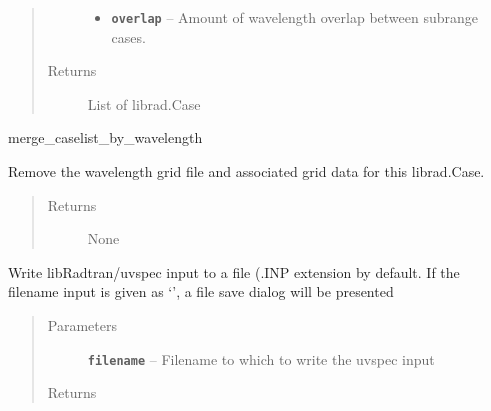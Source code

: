 \documentclass[a4paper,10pt,english]{sphinxmanual}
\begin{document}
\begin{fulllineitems}
\begin{fulllineitems}
\begin{quote}
\begin{description}
\begin{itemize}
\item {} 
\textbf{\texttt{overlap}} -- Amount of wavelength overlap between subrange cases.

\end{itemize}

\item[{Returns}] \leavevmode
List of librad.Case

\end{description}\end{quote}




merge\_caselist\_by\_wavelength



\end{fulllineitems}


\begin{fulllineitems}
\label{packages:librad.Case.unset_wavelength_grid}
Remove the wavelength grid file and associated grid data for this librad.Case.
\begin{quote}\begin{description}
\item[{Returns}] \leavevmode
None

\end{description}\end{quote}

\end{fulllineitems}


\begin{fulllineitems}
\label{packages:librad.Case.write}
Write libRadtran/uvspec input to a file (.INP extension by default.
If the filename input is given as `', a file save dialog will be presented
\begin{quote}\begin{description}
\item[{Parameters}] \leavevmode
\textbf{\texttt{filename}} -- Filename to which to write the uvspec input

\item[{Returns}] \leavevmode


\end{description}\end{quote}

\end{fulllineitems}


\end{fulllineitems}
\end{document}
